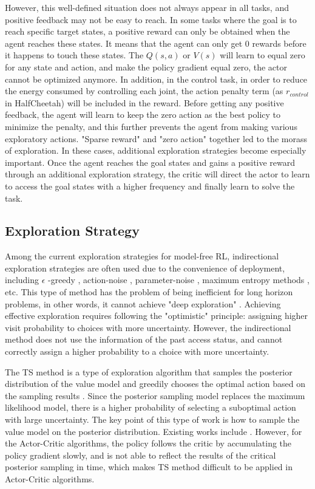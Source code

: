 However, this well-defined situation does not always appear in all tasks, and positive feedback may not be easy to reach. In some tasks where the goal is to reach specific target states, a positive reward can only be obtained when the agent reaches these states. It means that the agent can only get 0 rewards before it happens to touch these states. The $Q(s,a)$ or $V(s)$ will learn to equal zero for any state and action, and make the policy gradient equal zero, the actor cannot be optimized anymore. In addition, in the control task, in order to reduce the energy consumed by controlling each joint, the action penalty term (as $r_{control}$ in HalfCheetah) will be included in the reward. Before getting any positive feedback, the agent will learn to keep the zero action as the best policy to minimize the penalty, and this further prevents the agent from making various exploratory actions. "Sparse reward" and "zero action" together led to the morass of exploration. In these cases, additional exploration strategies become especially important. Once the agent reaches the goal states and gains a positive reward through an additional exploration strategy, the critic will direct the actor to learn to access the goal states with a higher frequency and finally learn to solve the task.

\subsection{Exploration Strategy}
Among the current exploration strategies for model-free RL, indirectional exploration strategies are often used due to the convenience of deployment, including $\epsilon$ -greedy \cite{DQN}, action-noise \cite{DDPG}, parameter-noise \cite{pnoise}, maximum entropy methods \cite{SQL}, etc. This type of method has the problem of being inefficient for long horizon problems, in other words, it cannot achieve "deep exploration" \cite{osband2018randomized}. Achieving effective exploration requires following the "optimistic" principle: assigning higher visit probability to choices with more uncertainty. However, the indirectional method does not use the information of the past access status, and cannot correctly assign a higher probability to a choice with more uncertainty.

The TS method is a type of exploration algorithm that samples the posterior distribution of the value model and greedily chooses the optimal action based on the sampling results \cite{TStutorial}. Since the posterior sampling model replaces the maximum likelihood model, there is a higher probability of selecting a suboptimal action with large uncertainty. The key point of this type of work is how to sample the value model on the posterior distribution. Existing works include \cite{BDQN, osband2018randomized, lastLayerBayes}. However, for the Actor-Critic algorithms, the policy follows the critic by accumulating the policy gradient slowly, and is not able to reflect the results of the critical posterior sampling in time, which makes TS method difficult to be applied in Actor-Critic algorithms.

